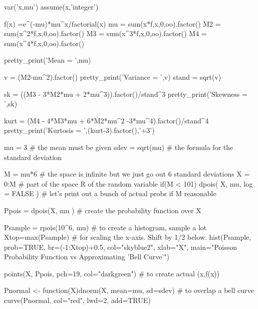 \documentclass[10pt,]{book}
\numberwithin{equation}{section}
\begin{document}
\leavevmode%
\begin{sageinput}
var('x,mu')
assume(x,'integer')

f(x) =e^(-mu)*mu^x/factorial(x)
mu = sum(x*f,x,0,oo).factor()
M2 = sum(x^2*f,x,0,oo).factor()
M3 = sum(x^3*f,x,0,oo).factor()
M4 = sum(x^4*f,x,0,oo).factor()

pretty_print('Mean = ',mu)

v = (M2-mu^2).factor()
pretty_print('Variance = ',v)
stand = sqrt(v)

sk = ((M3 - 3*M2*mu + 2*mu^3)).factor()/stand^3
pretty_print('Skewness = ',sk)

kurt = (M4 - 4*M3*mu + 6*M2*mu^2 -3*mu^4).factor()/stand^4
pretty_print('Kurtosis = ',(kurt-3).factor(),'+3')
\end{sageinput}
%
\par
\hypertarget{p-1065}{}%
\leavevmode%
\begin{sageinput}
mu = 3           # the mean must be given
sdev = sqrt(mu)  # the formula for the standard deviation

M = mu*6   # the space is infinite but we just go out 6 standard deviations
X = 0:M    # part of the space R of the random variable 
if(M < 101){
dpois( X, mu, log = FALSE )   # let's print out a bunch of actual probs if M reasonable
}

Ppois = dpois(X, mu )  # create the probability function over X

Psample = rpois(10^6, mu)  # to create a histogram, sample a lot
Xtop=max(Psample)          # for scaling the x-axis. Shift by 1/2 below.
hist(Psample, prob=TRUE, br=(-1:Xtop)+0.5, col="skyblue2", xlab="X", 
  main="Poisson Probability Function vs Approximating 'Bell Curve'")

points(X, Ppois, pch=19, col="darkgreen")  # to create actual (x,f(x))

Pnormal <- function(X){dnorm(X, mean=mu, sd=sdev)}   # to overlap a bell curve
curve(Pnormal, col="red", lwd=2, add=TRUE)
\end{sageinput}
%
%
%
\typeout{************************************************}
\typeout{************************************************}
%
\end{document}
